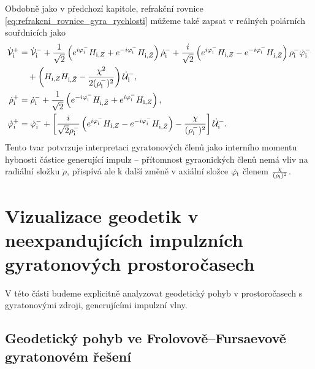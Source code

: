 Obdobně jako v předchozí kapitole, refrakční rovnice \eqref{eq:refrakcni_rovnice_gyra_rychlosti} můžeme také zapsat v reálných
polárních souřdnicích jako
\begin{equation}
    \begin{split}
    \dot{\mathcal{V}}_{\mathrm{i}}^{+} &= \dot{\mathcal{V}}_{\mathrm{i}}^{-} + \frac{1}{\sqrt{2}} \left(e^{i \varphi_{\mathrm{i}}^{-}} H_{\mathrm{i}, Z} + e^{-i \varphi_{\mathrm{i}}^{-}} H_{\mathrm{i}, \bar{Z}}\right) \dot{\rho}_{\mathrm{i}}^{-} +
    \frac{i}{\sqrt{2}} \left( e^{i \varphi_{\mathrm{i}}^{-}} H_{\mathrm{i}, Z} - e^{-i \varphi_{\mathrm{i}}^{-}} H_{\mathrm{i}, \bar{Z}} \right) \rho_{\mathrm{i}}^{-} \dot{\varphi}_{\mathrm{i}}^{-} \\
    &~~~+ \left(H_{\mathrm{i}, Z} H_{\mathrm{i}, \bar{Z}} - \frac{\chi^2}{2(\rho_{\mathrm{i}}^{-})^2}\right)\dot{\mathcal{U}}_{\mathrm{i}}^{-}, \\
    \dot{\rho}_{\mathrm{i}}^{+} &= \dot{\rho}_{\mathrm{i}}^{-} + \frac{1}{\sqrt{2}} \left(e^{-i \varphi_{\mathrm{i}}^{-}} H_{\mathrm{i}, \bar{Z}} + e^{i \varphi_{\mathrm{i}}^{-}} H_{\mathrm{i}, Z} \right), \\
    \dot{\varphi}_{\mathrm{i}}^{+} &= \dot{\varphi}_{\mathrm{i}}^{-} + \left[ \frac{i}{\sqrt{2} \rho_{\mathrm{i}}^{-}} \left(e^{i \varphi_{\mathrm{i}}^{-}} H_{\mathrm{i}, Z} - e^{-i \varphi_{\mathrm{i}}^{-}} H_{\mathrm{i}, \bar{Z}} \right) - \frac{\chi}{(\rho_{\mathrm{i}}^{-})^2}\right] \dot{\mathcal{U}}_{\mathrm{i}}^{-}.
    \end{split}
\end{equation}
Tento tvar potvrzuje interpretaci gyratonových členů jako interního momentu hybnosti částice generující impulz -- 
přítomnost gyraonických členů nemá vliv na radiální složku $\dot{\rho}$, přispívá ale k další změně v
axiální složce $\dot{\varphi_{\mathrm{i}}}$ členem $\frac{\chi}{(\rho_{\mathrm{i}})^2}$.

\section{Vizualizace geodetik v neexpandujících impulzních gyratonových prostoročasech}
V této části budeme explicitně analyzovat geodetický pohyb v prostoročasech s gyratonovými zdroji, generujícími impulzní vlny.
\subsection{Geodetický pohyb ve Frolovově--Fursaevově gyratonovém řešení}


